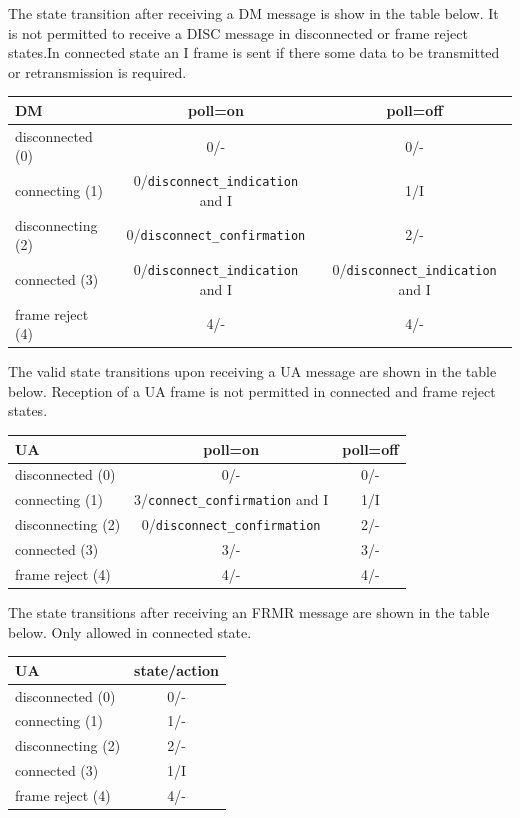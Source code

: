 \documentclass[a4paper]{article}
\begin{document}
The state transition after receiving a DM message is show in the table below. It is not permitted to receive a DISC message in disconnected or frame reject states.In connected state an I frame is sent if there some data to be transmitted or retransmission is required.  

{\footnotesize
\begin{center}
\begin{tabular}{|l|c|c|}
\hline
 DM & poll=on & poll=off\\
\hline
 disconnected (0)& 0/- & 0/- \\
\hline
 connecting (1) & 0/\verb!disconnect_indication! and I & 1/I\\
\hline
 disconnecting (2) & 0/\verb!disconnect_confirmation! & 2/-\\
\hline
 connected (3) & 0/\verb!disconnect_indication! and I & 0/\verb!disconnect_indication! and I\\
\hline
 frame reject (4) & 4/- & 4/- \\
\hline
\end{tabular}
\end{center}
}

The valid state transitions upon receiving a UA message are shown in the table below. Reception of a UA frame is not permitted in connected and frame reject states.

{\footnotesize
\begin{center}
\begin{tabular}{|l|c|c|}
\hline
 UA & poll=on & poll=off\\
\hline
 disconnected (0)& 0/- & 0/- \\
\hline
 connecting (1) & 3/\verb!connect_confirmation! and I & 1/I\\
\hline
 disconnecting (2) & 0/\verb!disconnect_confirmation! & 2/-\\
\hline
 connected (3) & 3/- & 3/- \\
\hline
 frame reject (4) & 4/- & 4/-\\
\hline
\end{tabular}
\end{center}
}


The state transitions after receiving an FRMR message are shown in the table below. Only allowed in connected state.

{\footnotesize
\begin{center}
\begin{tabular}{|l|c|}
\hline
 UA & state/action \\
\hline
 disconnected (0)& 0/- \\
\hline
 connecting (1) & 1/- \\
\hline
 disconnecting (2) & 2/- \\
\hline
 connected (3) & 1/I  \\
\hline
 frame reject (4) & 4/- \\
\hline
\end{tabular}
\end{center}
}
\end{document}
